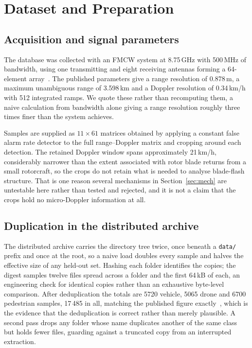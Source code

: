 \documentclass[11pt,a4paper]{article}
\newcommand{\s}[1]{\texttt{#1}}            %
\begin{document}
\section{Dataset and Preparation}
\label{sec:data}

\subsection{Acquisition and signal parameters}

The database was collected with an FMCW system at 8.75\,GHz with 500\,MHz of bandwidth, using one transmitting and eight receiving antennas forming a 64-element array~\cite{roldan2020,quevedo2019}. The published parameters give a range resolution of 0.878\,m, a maximum unambiguous range of 3.598\,km and a Doppler resolution of 0.34\,km/h with 512 integrated ramps. We quote these rather than recomputing them, a naive calculation from bandwidth alone giving a range resolution roughly three times finer than the system achieves.

Samples are supplied as $11 \times 61$ matrices obtained by applying a constant false alarm rate detector to the full range--Doppler matrix and cropping around each detection. The retained Doppler window spans approximately 21\,km/h, considerably narrower than the extent associated with rotor blade returns from a small rotorcraft, so the crops do not retain what is needed to analyse blade-flash structure. That is one reason several mechanisms in Section~\ref{sec:mech} are untestable here rather than tested and rejected, and it is not a claim that the crops hold no micro-Doppler information at all.

\subsection{Duplication in the distributed archive}

The distributed archive carries the directory tree twice, once beneath a \s{data/} prefix and once at the root, so a naive load doubles every sample and halves the effective size of any held-out set. Hashing each folder identifies the copies; the digest samples twelve files spread across a folder and the first 64\,kB of each, an engineering check for identical copies rather than an exhaustive byte-level comparison. After deduplication the totals are 5720 vehicle, 5065 drone and 6700 pedestrian samples, 17\,485 in all, matching the published figure exactly~\cite{zhang2025}, which is the evidence that the deduplication is correct rather than merely plausible. A second pass drops any folder whose name duplicates another of the same class but holds fewer files, guarding against a truncated copy from an interrupted extraction.
\end{document}
